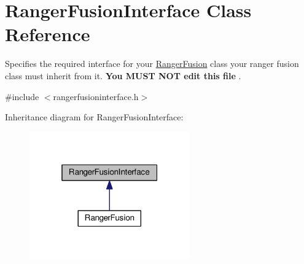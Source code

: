\hypertarget{class_ranger_fusion_interface}{}\section{Ranger\+Fusion\+Interface Class Reference}
\label{class_ranger_fusion_interface}


Specifies the required interface for your \hyperlink{class_ranger_fusion}{Ranger\+Fusion} class your ranger fusion class must inherit from it. {\bfseries  You M\+U\+ST N\+OT edit this file }.  




{\ttfamily \#include $<$rangerfusioninterface.\+h$>$}



Inheritance diagram for Ranger\+Fusion\+Interface\+:
\nopagebreak
\begin{figure}[H]
\begin{center}
\leavevmode
\includegraphics[width=196pt]{class_ranger_fusion_interface__inherit__graph}
\end{center}
\end{figure}
